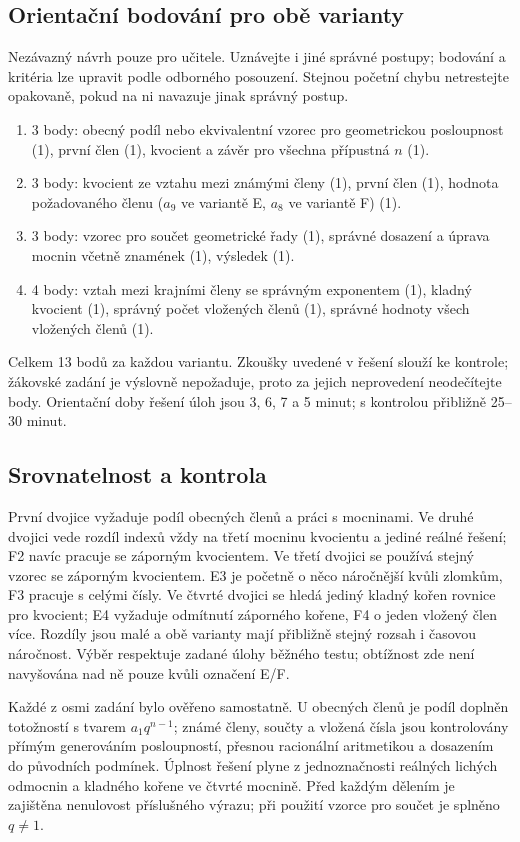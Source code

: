 \documentclass[a4paper,10pt]{article}
\begin{document}
\subsection*{Orientační bodování pro obě varianty}
Nezávazný návrh pouze pro učitele. Uznávejte i jiné správné postupy;
bodování a kritéria lze upravit podle odborného posouzení.
Stejnou početní chybu netrestejte opakovaně, pokud na ni navazuje
jinak správný postup.
\begin{enumerate}
\item 3 body: obecný podíl nebo ekvivalentní vzorec pro geometrickou
posloupnost (1), první člen (1), kvocient a závěr pro všechna přípustná $n$ (1).
\item 3 body: kvocient ze vztahu mezi známými členy (1), první člen (1),
hodnota požadovaného členu ($a_9$ ve variantě E, $a_8$ ve variantě F) (1).
\item 3 body: vzorec pro součet geometrické řady (1), správné dosazení
a úprava mocnin včetně znamének (1), výsledek (1).
\item 4 body: vztah mezi krajními členy se správným exponentem (1),
kladný kvocient (1), správný počet vložených členů (1),
správné hodnoty všech vložených členů (1).
\end{enumerate}
Celkem 13 bodů za každou variantu. Zkoušky uvedené v řešení slouží
ke kontrole; žákovské zadání je výslovně nepožaduje, proto za jejich
neprovedení neodečítejte body. Orientační doby řešení úloh jsou
3, 6, 7 a 5 minut; s kontrolou přibližně 25--30 minut.

\subsection*{Srovnatelnost a kontrola}
První dvojice vyžaduje podíl obecných členů a práci s mocninami.
Ve druhé dvojici vede rozdíl indexů vždy na třetí mocninu kvocientu
a jediné reálné řešení; F2 navíc pracuje se záporným kvocientem.
Ve třetí dvojici se používá stejný vzorec se záporným kvocientem.
E3 je početně o něco náročnější kvůli zlomkům, F3 pracuje s celými čísly.
Ve čtvrté dvojici se hledá jediný kladný kořen rovnice pro kvocient;
E4 vyžaduje odmítnutí záporného kořene, F4 o jeden vložený člen více.
Rozdíly jsou malé a obě varianty mají přibližně stejný rozsah i časovou
náročnost. Výběr respektuje zadané úlohy běžného testu;
obtížnost zde není navyšována nad ně pouze kvůli označení E/F.

Každé z osmi zadání bylo ověřeno samostatně. U obecných členů
je podíl doplněn totožností s tvarem $a_1q^{n-1}$; známé členy,
součty a vložená čísla jsou kontrolovány přímým generováním posloupností,
přesnou racionální aritmetikou a dosazením do původních podmínek.
Úplnost řešení plyne z jednoznačnosti reálných lichých odmocnin
a kladného kořene ve čtvrté mocnině. Před každým dělením je
zajištěna nenulovost příslušného výrazu; při použití vzorce pro součet
je splněno $q\ne1$.
\end{document}
